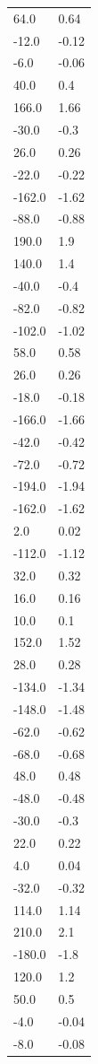 \begin{longtable}{ll}
64.0 & 0.64 \\
-12.0 & -0.12 \\
-6.0 & -0.06 \\
40.0 & 0.4 \\
166.0 & 1.66 \\
-30.0 & -0.3 \\
26.0 & 0.26 \\
-22.0 & -0.22 \\
-162.0 & -1.62 \\
-88.0 & -0.88 \\
190.0 & 1.9 \\
140.0 & 1.4 \\
-40.0 & -0.4 \\
-82.0 & -0.82 \\
-102.0 & -1.02 \\
58.0 & 0.58 \\
26.0 & 0.26 \\
-18.0 & -0.18 \\
-166.0 & -1.66 \\
-42.0 & -0.42 \\
-72.0 & -0.72 \\
-194.0 & -1.94 \\
-162.0 & -1.62 \\
2.0 & 0.02 \\
-112.0 & -1.12 \\
32.0 & 0.32 \\
16.0 & 0.16 \\
10.0 & 0.1 \\
152.0 & 1.52 \\
28.0 & 0.28 \\
-134.0 & -1.34 \\
-148.0 & -1.48 \\
-62.0 & -0.62 \\
-68.0 & -0.68 \\
48.0 & 0.48 \\
-48.0 & -0.48 \\
-30.0 & -0.3 \\
22.0 & 0.22 \\
4.0 & 0.04 \\
-32.0 & -0.32 \\
114.0 & 1.14 \\
210.0 & 2.1 \\
-180.0 & -1.8 \\
120.0 & 1.2 \\
50.0 & 0.5 \\
-4.0 & -0.04 \\
-8.0 & -0.08 \\

\end{longtable}
